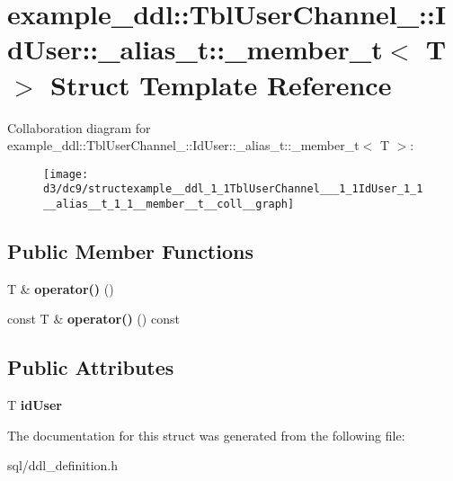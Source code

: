 \hypertarget{structexample__ddl_1_1TblUserChannel___1_1IdUser_1_1__alias__t_1_1__member__t}{}\section{example\+\_\+ddl\+:\+:Tbl\+User\+Channel\+\_\+\+:\+:Id\+User\+:\+:\+\_\+alias\+\_\+t\+:\+:\+\_\+member\+\_\+t$<$ T $>$ Struct Template Reference}
\label{structexample__ddl_1_1TblUserChannel___1_1IdUser_1_1__alias__t_1_1__member__t}


Collaboration diagram for example\+\_\+ddl\+:\+:Tbl\+User\+Channel\+\_\+\+:\+:Id\+User\+:\+:\+\_\+alias\+\_\+t\+:\+:\+\_\+member\+\_\+t$<$ T $>$\+:
\nopagebreak
\begin{figure}[H]
\begin{center}
\leavevmode
\texttt{[image: d3/dc9/structexample\_\_ddl\_1\_1TblUserChannel\_\_\_1\_1IdUser\_1\_1\_\_alias\_\_t\_1\_1\_\_member\_\_t\_\_coll\_\_graph]}
\end{center}
\end{figure}
\subsection*{Public Member Functions}
\begin{DoxyCompactItemize}
\item 
\hypertarget{structexample__ddl_1_1TblUserChannel___1_1IdUser_1_1__alias__t_1_1__member__t_a80725e6540080e1498386e7291630c0b}{}T \& {\bfseries operator()} ()\label{structexample__ddl_1_1TblUserChannel___1_1IdUser_1_1__alias__t_1_1__member__t_a80725e6540080e1498386e7291630c0b}

\item 
\hypertarget{structexample__ddl_1_1TblUserChannel___1_1IdUser_1_1__alias__t_1_1__member__t_ad881237f0c4f388190c632036a7c5a30}{}const T \& {\bfseries operator()} () const \label{structexample__ddl_1_1TblUserChannel___1_1IdUser_1_1__alias__t_1_1__member__t_ad881237f0c4f388190c632036a7c5a30}

\end{DoxyCompactItemize}
\subsection*{Public Attributes}
\begin{DoxyCompactItemize}
\item 
\hypertarget{structexample__ddl_1_1TblUserChannel___1_1IdUser_1_1__alias__t_1_1__member__t_ab3b869b3ddc6b3f9b0d4ce3a642ce40b}{}T {\bfseries id\+User}\label{structexample__ddl_1_1TblUserChannel___1_1IdUser_1_1__alias__t_1_1__member__t_ab3b869b3ddc6b3f9b0d4ce3a642ce40b}

\end{DoxyCompactItemize}


The documentation for this struct was generated from the following file\+:\begin{DoxyCompactItemize}
\item 
sql/ddl\+\_\+definition.\+h\end{DoxyCompactItemize}
